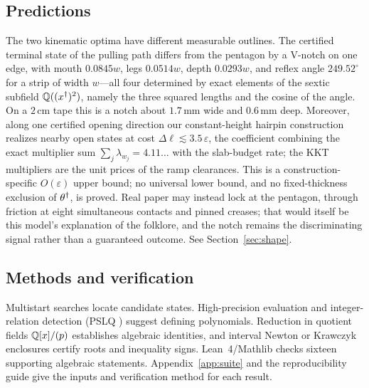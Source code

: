 \subsection{Predictions}
The two kinematic optima have different measurable outlines. The certified terminal state of the pulling path differs from the pentagon by a V-notch on one edge, with mouth $0.0845w$, legs $0.0514w$, depth $0.0293w$, and reflex angle $249.52^\circ$ for a strip of width $w$---all four determined by exact elements of the sextic subfield $\mathbb{Q}((x^\dagger)^2)$, namely the three squared lengths and the cosine of the angle. On a $2\,$cm tape this is a notch about $1.7\,$mm wide and $0.6\,$mm deep. Moreover, along one certified opening direction our constant-height hairpin construction realizes nearby open states at cost $\Delta\ell\lesssim3.5\,\varepsilon$, the coefficient combining the exact multiplier sum $\sum_j\lambda_{w_j}=4.11\ldots$ with the slab-budget rate; the KKT multipliers are the unit prices of the ramp clearances. This is a construction-specific $O(\varepsilon)$ upper bound; no universal lower bound, and no fixed-thickness exclusion of $\theta^\dagger$, is proved. Real paper may instead lock at the pentagon, through friction at eight simultaneous contacts and pinned creases; that would itself be this model's explanation of the folklore, and the notch remains the discriminating signal rather than a guaranteed outcome. See Section~\ref{sec:shape}.

\subsection{Methods and verification}
Multistart searches locate candidate states. High-precision evaluation and integer-relation detection (PSLQ \cite{fba1999}) suggest defining polynomials. Reduction in quotient fields $\mathbb{Q}[x]/(p)$ establishes algebraic identities, and interval Newton or Krawczyk enclosures certify roots and inequality signs. Lean~4/Mathlib \cite{mathlib2020} checks sixteen supporting algebraic statements. Appendix~\ref{app:suite} and the reproducibility guide \cite{anc} give the inputs and verification method for each result.

